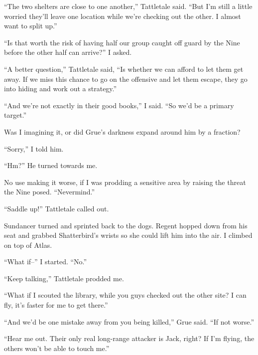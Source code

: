 ``The two shelters are close to one another,'' Tattletale said.  ``But I'm still a little worried they'll leave one location while we're checking out the other.  I almost want to split up.''



``Is that worth the risk of having half our group caught off guard by the Nine before the other half can arrive?''  I asked.



``A better question,'' Tattletale said, ``Is whether we can afford to let them get away.  If we miss this chance to go on the offensive and let them escape, they go into hiding and work out a strategy.''



``And we're not exactly in their good books,'' I said.  ``So we'd be a primary target.''



Was I imagining it, or did Grue's darkness expand around him by a fraction?



``Sorry,'' I told him.



``Hm?''  He turned towards me.



No use making it worse, if I was prodding a sensitive area by raising the threat the Nine posed.  ``Nevermind.''



``Saddle up!''  Tattletale called out.



Sundancer turned and sprinted back to the dogs.  Regent hopped down from his seat and grabbed Shatterbird's wrists so she could lift him into the air.  I climbed on top of Atlas.



``What if--'' I started.  ``No.''



``Keep talking,'' Tattletale prodded me.



``What if I scouted the library, while you guys checked out the other site?  I can fly, it's faster for me to get there.''



``And we'd be one mistake away from you being killed,'' Grue said.  ``If not worse.''



``Hear me out.  Their only real long-range attacker is Jack, right?  If I'm flying, the others won't be able to touch me.''



